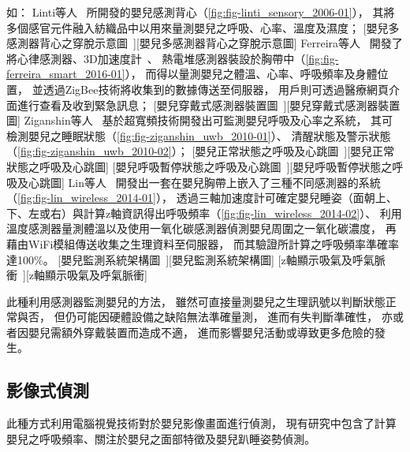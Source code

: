 \documentclass[class=NCU_thesis, crop=false]{standalone}
\begin{document}
如：
Linti等人~\cite{linti_sensory_2006}
所開發的嬰兒感測背心（\cref{fig:fig-linti_sensory_2006-01}），
其將多個感官元件融入紡織品中以用來量測嬰兒之呼吸、心率、溫度及濕度；
[嬰兒多感測器背心之穿脫示意圖~\cite{linti_sensory_2006}][嬰兒多感測器背心之穿脫示意圖]
Ferreira等人~\cite{ferreira_smart_2016}
開發了將心律感測器、3D加速度計~\cite{hung_estimation_2008, pitts_respiratory_2013, bates_respiratory_2010}、
熱電堆感測器裝設於胸帶中（\cref{fig:fig-ferreira_smart_2016-01}），
而得以量測嬰兒之體溫、心率、呼吸頻率及身體位置，
並透過ZigBee技術將收集到的數據傳送至伺服器，
用戶則可透過醫療網頁介面進行查看及收到緊急訊息；
[嬰兒穿戴式感測器裝置圖~\cite{ferreira_smart_2016}][嬰兒穿戴式感測器裝置圖]
Ziganshin等人~\cite{ziganshin_uwb_2010}
基於超寬頻技術開發出可監測嬰兒呼吸及心率之系統，
其可檢測嬰兒之睡眠狀態（\cref{fig:fig-ziganshin_uwb_2010-01}）、
清醒狀態及警示狀態（\cref{fig:fig-ziganshin_uwb_2010-02}）；
[嬰兒正常狀態之呼吸及心跳圖~\cite{ziganshin_uwb_2010}][嬰兒正常狀態之呼吸及心跳圖]
[嬰兒呼吸暫停狀態之呼吸及心跳圖~\cite{ziganshin_uwb_2010}][嬰兒呼吸暫停狀態之呼吸及心跳圖]
Lin等人~\cite{lin_wireless_2014}
開發出一套在嬰兒胸帶上嵌入了三種不同感測器的系統（\cref{fig:fig-lin_wireless_2014-01}），
透過三軸加速度計可確定嬰兒睡姿（面朝上、下、左或右）與計算z軸資訊得出呼吸頻率（\cref{fig:fig-lin_wireless_2014-02}）、
利用溫度感測器量測體溫以及使用一氧化碳感測器偵測嬰兒周圍之一氧化碳濃度，
再藉由WiFi模組傳送收集之生理資料至伺服器，
而其驗證所計算之呼吸頻率準確率達100\%。
[嬰兒監測系統架構圖~\cite{lin_wireless_2014}][嬰兒監測系統架構圖]
[z軸顯示吸氣及呼氣脈衝~\cite{lin_wireless_2014}][z軸顯示吸氣及呼氣脈衝]

此種利用感測器監測嬰兒的方法，
雖然可直接量測嬰兒之生理訊號以判斷狀態正常與否，
但仍可能因硬體設備之缺陷無法準確量測，
進而有失判斷準確性，
亦或者因嬰兒需額外穿戴裝置而造成不適，
進而影響嬰兒活動或導致更多危險的發生。

\subsection{影像式偵測}
此種方式利用電腦視覺技術對於嬰兒影像畫面進行偵測，
現有研究中包含了計算嬰兒之呼吸頻率、關注於嬰兒之面部特徵及嬰兒趴睡姿勢偵測。
\end{document}

